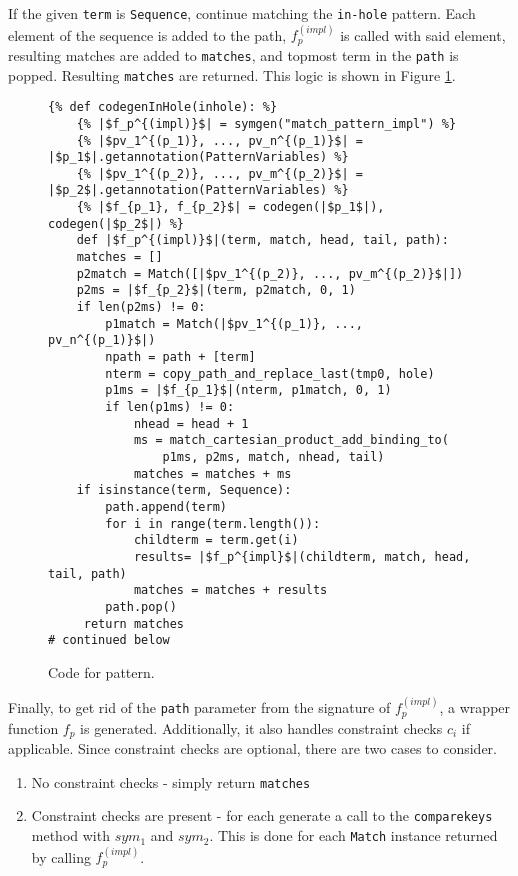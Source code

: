 If the given \texttt{term} is \texttt{Sequence}, continue matching the \texttt{in-hole} pattern. Each element of the sequence is added to the path, $f_p^{(impl)}$ is called with said element, resulting matches are added to \texttt{matches}, and topmost term in the \texttt{path} is popped. Resulting \texttt{matches} are returned. This logic is shown in Figure \ref{pat-inhole-1}.

\begin{figure}[!htb]
\begin{verbatim}
{% def codegenInHole(inhole): %}
	{% |$f_p^{(impl)}$| = symgen("match_pattern_impl") %}
	{% |$pv_1^{(p_1)}, ..., pv_n^{(p_1)}$| = |$p_1$|.getannotation(PatternVariables) %}
	{% |$pv_1^{(p_2)}, ..., pv_m^{(p_2)}$| = |$p_2$|.getannotation(PatternVariables) %}
	{% |$f_{p_1}, f_{p_2}$| = codegen(|$p_1$|), codegen(|$p_2$|) %}
	def |$f_p^{(impl)}$|(term, match, head, tail, path):
	matches = []
	p2match = Match([|$pv_1^{(p_2)}, ..., pv_m^{(p_2)}$|])
	p2ms = |$f_{p_2}$|(term, p2match, 0, 1)
	if len(p2ms) != 0:
		p1match = Match(|$pv_1^{(p_1)}, ..., pv_n^{(p_1)}$|)
		npath = path + [term]
		nterm = copy_path_and_replace_last(tmp0, hole)
		p1ms = |$f_{p_1}$|(nterm, p1match, 0, 1)
		if len(p1ms) != 0:
			nhead = head + 1
			ms = match_cartesian_product_add_binding_to(
				p1ms, p2ms, match, nhead, tail)
			matches = matches + ms
	if isinstance(term, Sequence):
		path.append(term)
		for i in range(term.length()):
			childterm = term.get(i)
			results= |$f_p^{impl}$|(childterm, match, head, tail, path)
			matches = matches + results
		path.pop()
	 return matches
# continued below
\end{verbatim}
\caption{Code for \PatternInHoleNoArg \space pattern.}
\label{pat-inhole-1}
\end{figure}

Finally, to get rid of the \texttt{path} parameter from the signature of $f_p^{(impl)}$, a wrapper function $f_p$ is generated. Additionally, it also handles constraint checks $c_i$ if applicable. Since constraint checks are optional, there are two cases to consider.

\begin{enumerate}
\item No constraint checks - simply return \texttt{matches}
\item Constraint checks are present - for each \PatternCheckConstraint \space generate a call to the \texttt{comparekeys} method with $sym_1$ and $sym_2$. This is done for each \texttt{Match} instance returned by calling $f_p^{(impl)}$.
\end{enumerate}

